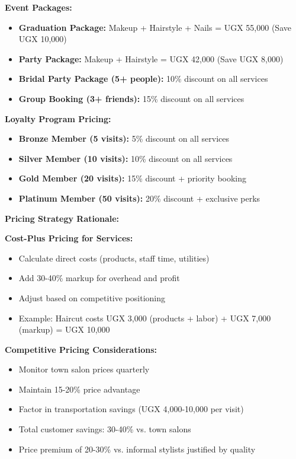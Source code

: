 \textbf{Event Packages:}
\begin{itemize}[leftmargin=2em]
    \item \textbf{Graduation Package:} Makeup + Hairstyle + Nails = UGX 55,000 (Save UGX 10,000)
    \item \textbf{Party Package:} Makeup + Hairstyle = UGX 42,000 (Save UGX 8,000)
    \item \textbf{Bridal Party Package (5+ people):} 10\% discount on all services
    \item \textbf{Group Booking (3+ friends):} 15\% discount on all services
\end{itemize}

\textbf{Loyalty Program Pricing:}
\begin{itemize}[leftmargin=2em]
    \item \textbf{Bronze Member (5 visits):} 5\% discount on all services
    \item \textbf{Silver Member (10 visits):} 10\% discount on all services
    \item \textbf{Gold Member (20 visits):} 15\% discount + priority booking
    \item \textbf{Platinum Member (50 visits):} 20\% discount + exclusive perks
\end{itemize}

\vspace{1em}

\textbf{Pricing Strategy Rationale:}

\textbf{Cost-Plus Pricing for Services:}
\begin{itemize}[leftmargin=2em]
    \item Calculate direct costs (products, staff time, utilities)
    \item Add 30-40\% markup for overhead and profit
    \item Adjust based on competitive positioning
    \item Example: Haircut costs UGX 3,000 (products + labor) + UGX 7,000 (markup) = UGX 10,000
\end{itemize}

\textbf{Competitive Pricing Considerations:}
\begin{itemize}[leftmargin=2em]
    \item Monitor town salon prices quarterly
    \item Maintain 15-20\% price advantage
    \item Factor in transportation savings (UGX 4,000-10,000 per visit)
    \item Total customer savings: 30-40\% vs. town salons
    \item Price premium of 20-30\% vs. informal stylists justified by quality
\end{itemize}

